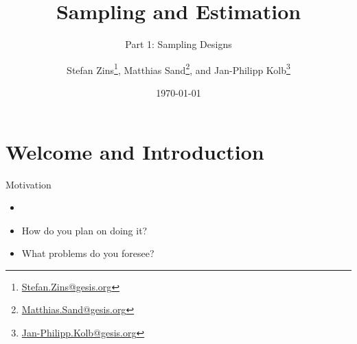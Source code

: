\documentclass[10pt]{beamer}\usepackage[]{graphicx}\usepackage[]{color}
\newcommand\makebeamertitle{\frame{\maketitle}}%
\begin{document}




\title[Sampling Designs]{Sampling and Estimation}   
\subtitle{Part 1: Sampling Designs}

\author{Stefan Zins\thanks{\href{mailto:Stefan.Zins@gesis.org}{Stefan.Zins@gesis.org}}, Matthias Sand\thanks{\href{mailto:Matthias.Sand@gesis.org}{Matthias.Sand@gesis.org}}, and Jan-Philipp Kolb\thanks{\href{mailto:Jan-Philipp.Kolb@gesis.org}{Jan-Philipp.Kolb@gesis.org}}}
\date{\today} 

\makebeamertitle

\section{Welcome and Introduction}


\begin{frame}{Motivation}

  \begin{itemize}
    \item<1-2,3->  
         \vspace{1cm}
    \item<3-> How do you plan on doing it?  \vspace{1cm}
    \item<4>  What problems do you foresee?
  \end{itemize}
\end{frame}
\end{document}
